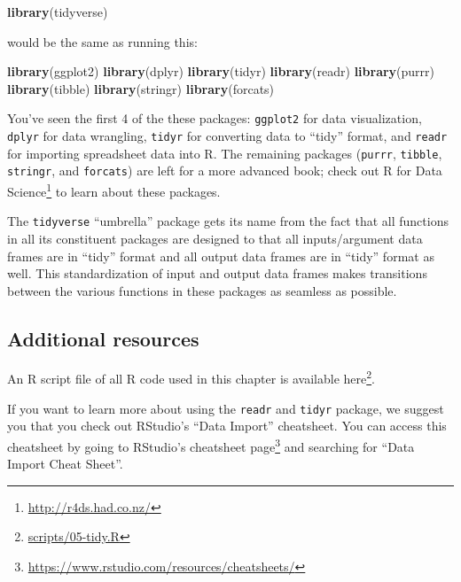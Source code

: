 \documentclass[12pt, krantz2,]{krantz}
\makeatletter
\newenvironment{Shaded}{\begin{snugshade}}{\end{snugshade}}
\newcommand{\KeywordTok}[1]{\textcolor[rgb]{0.27,0.27,0.27}{\textbf{#1}}}
\newcommand{\NormalTok}[1]{#1}
\renewcommand{\href}[2]{#2\footnote{\url{#1}}}
\newenvironment{kframe}{%
\medskip{}
\setlength{\fboxsep}{.8em}
 \def\at@end@of@kframe{}%
 \ifinner\ifhmode%
  \def\at@end@of@kframe{\end{minipage}}%
  \begin{minipage}{\columnwidth}%
 \fi\fi%
 \def\FrameCommand##1{\hskip\@totalleftmargin \hskip-\fboxsep
 \colorbox{shadecolor}{##1}\hskip-\fboxsep
     \hskip-\linewidth \hskip-\@totalleftmargin \hskip\columnwidth}%
 \MakeFramed {\advance\hsize-\width
   \@totalleftmargin\z@ \linewidth\hsize
   \@setminipage}}%
 {\par\unskip\endMakeFramed%
 \at@end@of@kframe}
\renewenvironment{Shaded}{\begin{kframe}}{\end{kframe}}
\makeatother
\begin{document}
\begin{Shaded}
\begin{Highlighting}[]
\KeywordTok{library}\NormalTok{(tidyverse)}
\end{Highlighting}
\end{Shaded}

would be the same as running this:

\begin{Shaded}
\begin{Highlighting}[]
\KeywordTok{library}\NormalTok{(ggplot2)}
\KeywordTok{library}\NormalTok{(dplyr)}
\KeywordTok{library}\NormalTok{(tidyr)}
\KeywordTok{library}\NormalTok{(readr)}
\KeywordTok{library}\NormalTok{(purrr)}
\KeywordTok{library}\NormalTok{(tibble)}
\KeywordTok{library}\NormalTok{(stringr)}
\KeywordTok{library}\NormalTok{(forcats)}
\end{Highlighting}
\end{Shaded}

You've seen the first 4 of the these packages: \texttt{ggplot2} for data visualization, \texttt{dplyr} for data wrangling, \texttt{tidyr} for converting data to ``tidy'' format, and \texttt{readr} for importing spreadsheet data into R. The remaining packages (\texttt{purrr}, \texttt{tibble}, \texttt{stringr}, and \texttt{forcats}) are left for a more advanced book; check out \href{http://r4ds.had.co.nz/}{R for Data Science} to learn about these packages.

The \texttt{tidyverse} ``umbrella'' package gets its name from the fact that all functions in all its constituent packages are designed to that all inputs/argument data frames are in ``tidy'' format and all output data frames are in ``tidy'' format as well. This standardization of input and output data frames makes transitions between the various functions in these packages as seamless as possible.

\hypertarget{additional-resources-3}{%
\subsection{Additional resources}\label{additional-resources-3}}

An R script file of all R code used in this chapter is available \href{scripts/05-tidy.R}{here}.

If you want to learn more about using the \texttt{readr} and \texttt{tidyr} package, we suggest you that you check out RStudio's ``Data Import'' cheatsheet. You can access this cheatsheet by going to RStudio's \href{https://www.rstudio.com/resources/cheatsheets/}{cheatsheet page} and searching for ``Data Import Cheat Sheet''.
\end{document}
